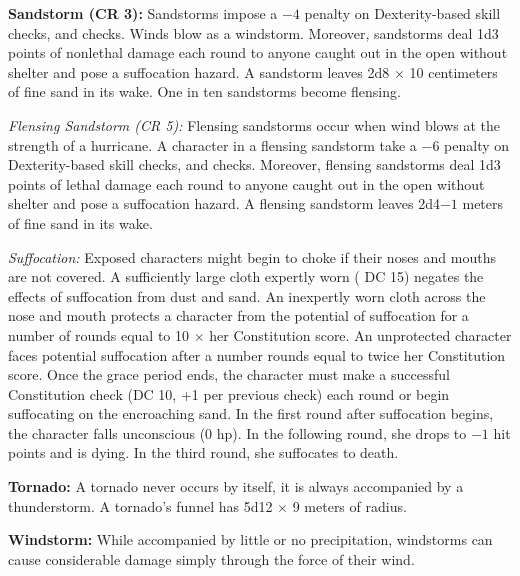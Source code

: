 
\textbf{Sandstorm (CR 3):} Sandstorms impose a $-4$ penalty on Dexterity-based skill checks, and  checks. Winds blow as a windstorm. Moreover, sandstorms deal 1d3 points of nonlethal damage each round to anyone caught out in the open without shelter and pose a suffocation hazard. A sandstorm leaves 2d8 $\times$ 10 centimeters of fine sand in its wake. One in ten sandstorms become flensing.

\textit{Flensing Sandstorm (CR 5):} Flensing sandstorms occur when wind blows at the strength of a hurricane. A character in a flensing sandstorm take a $-6$ penalty on Dexterity-based skill checks, and  checks. Moreover, flensing sandstorms deal 1d3 points of lethal damage each round to anyone caught out in the open without shelter and pose a suffocation hazard. A flensing sandstorm leaves 2d4$-1$ meters of fine sand in its wake.

\textit{Suffocation:} Exposed characters might begin to choke if their noses and mouths are not covered. A sufficiently large cloth expertly worn ( DC 15) negates the effects of suffocation from dust and sand. An inexpertly worn cloth across the nose and mouth protects a character from the potential of suffocation for a number of rounds equal to 10 $\times$ her Constitution score. An unprotected character faces potential suffocation after a number rounds equal to twice her Constitution score. Once the grace period ends, the character must make a successful Constitution check (DC 10, +1 per previous check) each round or begin suffocating on the encroaching sand. In the first round after suffocation begins, the character falls unconscious (0 hp). In the following round, she drops to $-1$ hit points and is dying. In the third round, she suffocates to death.

\textbf{Tornado:} A tornado never occurs by itself, it is always accompanied by a thunderstorm. A tornado's funnel has 5d12 $\times$ 9 meters of radius.

\textbf{Windstorm:} While accompanied by little or no precipitation, windstorms can cause considerable damage simply through the force of their wind.

